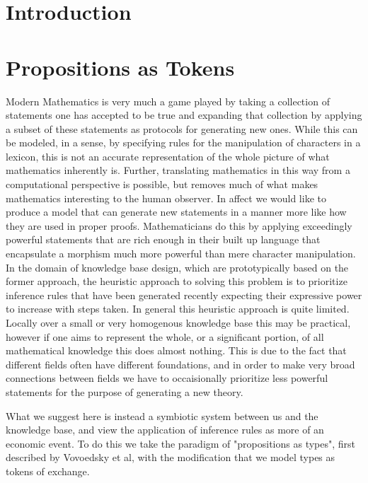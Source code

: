 \documentclass[12pt]{amsart}
\begin{document}
\newtheorem{thm}{\noindent\bf Theorem:}[section]
\newtheorem{lem}{\noindent\bf Lemma:}[section]
\newtheorem{cor}{\noindent\bf Corrallary:}[section]
\newenvironment{myproof}{\noindent\textbf{Proof:}}{QED }
\newcommand{\N}{\mathbb{N}}
\newcommand{\bigO}{\mathbb{O}}
\newcommand{\pyspace}{\hspace{12pt}}


\section{Introduction}

\section{Propositions as Tokens}

Modern Mathematics is very much a game played by taking a collection of statements one has accepted to be true and expanding that collection by applying a subset of these statements as protocols for generating new ones. While this can be modeled, in a sense, by specifying rules for the manipulation of characters in a lexicon, this is not an accurate representation of the whole picture of what mathematics inherently is. Further, translating mathematics in this way from a computational perspective is possible, but removes much of what makes mathematics interesting to the human observer. In affect we would like to produce a model that can generate new statements in a manner more like how they are used in proper proofs. Mathematicians do this by applying exceedingly powerful statements that are rich enough in their built up language that encapsulate a morphism much more powerful than mere character manipulation. In the domain of knowledge base design, which are prototypically based on the former approach, the heuristic approach to solving this problem is to prioritize inference rules that have been generated recently expecting their expressive power to increase with steps taken. In general this heuristic approach is quite limited. Locally over a small or very homogenous knowledge base this may be practical, however if one aims to represent the whole, or a significant portion, of all mathematical knowledge this does almost nothing. This is due to the fact that different fields often have different foundations, and in order to make very broad connections between fields we have to occaisionally prioritize less powerful statements for the purpose of generating a new theory.

What we suggest here is instead a symbiotic system between us and the knowledge base, and view the application of inference rules as more of an economic event. To do this we take the paradigm of "propositions as types", first described by Vovoedsky et al, with the modification that we model types as tokens of exchange.
\end{document}
